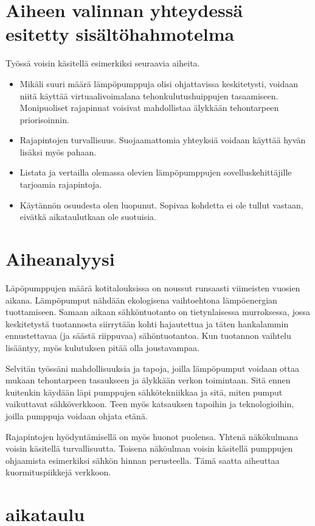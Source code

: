 \section{Aiheen valinnan yhteydessä esitetty sisältöhahmotelma}
  Työssä voisin käsitellä esimerkiksi seuraavia aiheita.
  \begin{itemize}
    \item  Mikäli suuri määrä lämpöpumppuja olisi ohjattavissa keskitetysti, voidaan niitä käyttää virtuaalivoimalana tehonkulutushuippujen tasaamiseen. Monipuoliset rajapinnat voisivat mahdollistaa älykkään tehontarpeen priorisoinnin.
    \item Rajapintojen turvallisuus. Suojaamattomia yhteyksiä voidaan käyttää hyvän lisäksi myös pahaan.
    \item Listata ja vertailla olemassa olevien lämpöpumppujen sovelluskehittäjille tarjoamia rajapintoja.
    \item Käytännön osuudesta olen luopunut. Sopivaa kohdetta ei ole tullut vastaan, eivätkä aikataulutkaan ole suotuisia.
  \end{itemize}
\section{Aiheanalyysi}

  Läpöpumppujen määrä kotitalouksissa on noussut runsaasti viimeisten vuosien aikana. Lämpöpumput nähdään ekologisena vaihtoehtona lämpöenergian tuottamiseen. Samaan aikaan sähköntuotanto on tietynlaisessa murroksessa, jossa keskitetystä tuotannosta siirrytään kohti hajautettua ja täten hankalammin ennustettavaa (ja säästä riippuvaa) sähöntuotantoa. Kun tuotannon vaihtelu lisääntyy, myös kulutuksen pitää olla joustavampaa.

  Selvitän työssäni mahdollisuuksia ja tapoja, joilla lämpöpumput voidaan ottaa mukaan tehontarpeen tasaukseen ja älykkään verkon toimintaan. Sitä ennen kuitenkin käydään läpi pumppujen sähkötekniikkaa ja sitä, miten pumput vaikuttavat sähköverkkoon. Teen myös katsauksen tapoihin ja teknologioihin, joilla pumppuja voidaan ohjata etänä.

  Rajapintojen hyödyntämisellä on myös huonot puolensa. Yhtenä näkökulmana voisin käsitellä turvallisuutta. Toisena näköulman voisin käsitellä pumppujen ohjaamista esimerkiksi sähkön hinnan perusteella. Tämä saatta aiheuttaa kuormituspiikkejä verkkoon.

\section{aikataulu}

